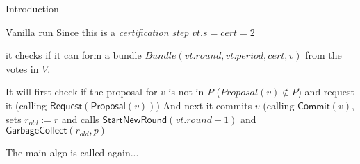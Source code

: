 \documentclass[10pt,a4paper]{article}
\begin{document}
\begin{section}{Introduction}
\begin{subsection}{Vanilla run}
Since this is a {\em certification step} $vt.s = cert=2$

it checks if it can form a bundle $Bundle(vt.round, vt.period, cert, v)$ from the votes
in $V$.

It will first check if the proposal for $v$ is not in $P$ ($Proposal(v)\notin P$) and request
it (calling $\mathsf{Request}(\mathsf{Proposal}(v))$)
And next it commits $v$ (calling $\mathsf{Commit}(v)$, sets $r_{old}:=r$ and calls
$\mathsf{StartNewRound}(vt.round + 1)$ and $\mathsf{GarbageCollect}(r_{old}, p)$


The main algo is called again...



\end{subsection}

\end{section}
\end{document}
